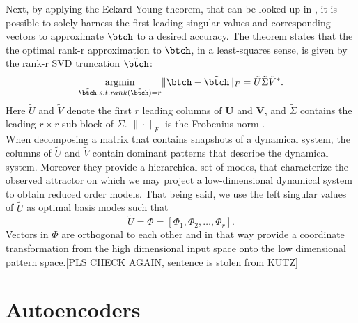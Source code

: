 Next, by applying the Eckard-Young theorem, that can be looked up in \cite{Kutz}, it is possible to solely harness the first leading singular values and corresponding vectors to approximate \(\btch\) to a desired accuracy. The theorem states that the the optimal rank-r approximation to $\btch$, in a least-squares sense, is given by the rank-r SVD truncation \(\tilde{\btch}\):
\begin{equation}
\underset{\tilde{\btch}, s.t. rank(\tilde{\btch})=r}{\operatorname{argmin}} \| 
\btch -\tilde{\btch}\|_F
=\tilde{U}\tilde{\Sigma}\tilde{V}^*\mathrm{.}
\label{Eq:EckardYoung}
\end{equation} 
Here \(\tilde{U}\) and \(\tilde{V}\) denote the first \(r\) leading columns of \(\mathbf{U}\) and \(\mathbf{V}\), and \(\tilde{\Sigma}\) contains the leading \(r \times r\) sub-block of \(\Sigma\). \(\|\cdot\|_F\) is the Frobenius norm \cite{Kutz}.\\
When decomposing a matrix that contains snapshots of a dynamical system, the columns of \(\tilde{U}\) and \(\tilde{V}\) contain dominant patterns that describe the dynamical system. Moreover they provide a hierarchical set of modes, that characterize the observed attractor on which we may project a low-dimensional dynamical system to obtain reduced order models. That being said, we use the left singular values of \(\tilde{U}\) as optimal basis modes such that
\begin{equation}
	\tilde{U} = \Phi = \left[\Phi_1,\Phi_2,\dots,\Phi_r\right]\mathrm{.}
\end{equation}
Vectors in \(\Phi\) are orthogonal to each other and in that way provide a coordinate transformation from the high dimensional input space onto the low dimensional pattern space.[PLS CHECK AGAIN, sentence is stolen from KUTZ]
\section{Autoencoders}
\label{Sec:AE}

